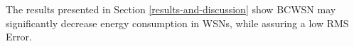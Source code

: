 \documentclass{acm_proc_article-sp}
\begin{document}
The results presented in Section \ref{results-and-discussion} show BCWSN may
significantly decrease energy consumption in WSNs, while assuring a low RMS
Error.
\vspace*{-.3cm}





  
\end{document}

